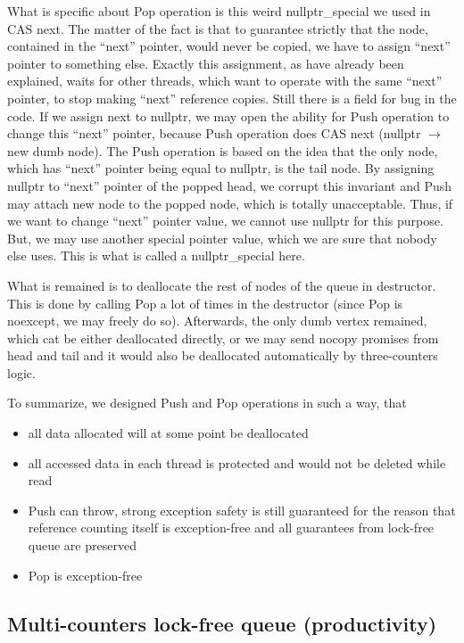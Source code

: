 \documentclass{article}
\begin{document}
What is specific about Pop operation is this weird nullptr\_special we used in CAS next. The matter of the fact is that to guarantee strictly that the node, contained in the ``next'' pointer, would never be copied, we have to assign ``next'' pointer to something else. Exactly this assignment, as have already been explained, waits for other threads, which want to operate with the same ``next'' pointer, to stop making ``next'' reference copies. Still there is a field for bug in the code. If we assign next to nullptr, we may open the ability for Push operation to change this ``next'' pointer, because Push operation does CAS next (nullptr $\rightarrow$ new dumb node). The Push operation is based on the idea that the only node, which has ``next'' pointer being equal to nullptr, is the tail node. By assigning nullptr to ``next'' pointer of the popped head, we corrupt this invariant and Push may attach new node to the popped node, which is totally unacceptable. Thus, if we want to change ``next'' pointer value, we cannot use nullptr for this purpose. But, we may use another special pointer value, which we are sure that nobody else uses. This is what is called a nullptr\_special here.

What is remained is to deallocate the rest of nodes of the queue in destructor. This is done by calling Pop a lot of times in the destructor (since Pop is noexcept, we may freely do so). Afterwards, the only dumb vertex remained, which cat be either deallocated directly, or we may send nocopy promises from head and tail and it would also be deallocated automatically by three-counters logic.

To summarize, we designed Push and Pop operations in such a way, that
\begin{itemize}
	\item all data allocated will at some point be deallocated
	\item all accessed data in each thread is protected and would not be deleted while read
	\item Push can throw, strong exception safety is still guaranteed for the reason that reference counting itself is exception-free and all guarantees from lock-free queue are preserved
	\item Pop is exception-free
\end{itemize}

\subsection{Multi-counters lock-free queue (productivity)}
\label{subsec:dealloc_lock_free_queue_productivity}
\end{document}
